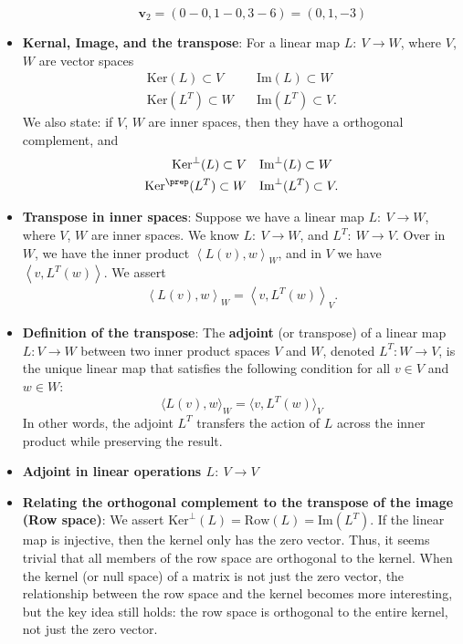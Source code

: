 \documentclass{report}
\begin{document}
\begin{itemize}
\begin{itemize}
                    \[
                        \mathbf{v}_2 = (0 - 0, 1 - 0, 3 - 6) = (0, 1, -3)
                    \]
            \end{itemize}
        \item \textbf{Kernal, Image, and the transpose}: For a linear map $L:\ V \to W$, where $V$, $W$ are vector spaces
            \begin{align*}
                \text{Ker}(L) \subset V &\quad \text{Im}(L) \subset W \\
                \text{Ker}(L^{T}) \subset W &\quad \text{Im}(L^{T}) \subset V
            .\end{align*}
            We also state: if $V$, $W$ are inner spaces, then they have a orthogonal complement, and
            \begin{align*}
                \text{Ker}^{\perp}(L) \subset V &\quad \text{Im}^{\perp}(L) \subset W \\
                \text{Ker}^{\prep}(L^{T}) \subset W &\quad \text{Im}^{\perp}(L^{T}) \subset V
            .\end{align*}
        \item \textbf{Transpose in inner spaces}: Suppose we have a linear map $L:\ V \to W$, where $V$, $W$ are inner spaces. We know $L:\ V \to W$, and $L^{T}:\  W \to V$. Over in $W$, we have the inner product $\left\langle L(v), w\right\rangle_{W}$, and in $V$ we have $\left\langle v, L^{T}(w) \right\rangle $. We assert
            \begin{align*}
                \left\langle L(v), w \right\rangle_{W} = \left\langle v, L^{T}(w) \right\rangle_{V}
            .\end{align*}
        \item \textbf{Definition of the transpose}: The \textbf{adjoint} (or transpose) of a linear map \( L: V \to W \) between two inner product spaces \( V \) and \( W \), denoted \( L^T: W \to V \), is the unique linear map that satisfies the following condition for all \( v \in V \) and \( w \in W \):
            \[
                \langle L(v), w \rangle_W = \langle v, L^T(w) \rangle_V
            \]
            In other words, the adjoint \( L^T \) transfers the action of \( L \) across the inner product while preserving the result.
        \item \textbf{Adjoint in linear operations $L:\ V\to V$}
        \item \textbf{Relating the orthogonal complement to the transpose of the image (Row space)}: We assert $\text{Ker}^{\perp}(L) = \text{Row}(L) = \text{Im}(L^{T})$. If the linear map is injective, then the kernel only has the zero vector. Thus, it seems trivial that all members of the row space are orthogonal to the kernel. When the kernel (or null space) of a matrix is not just the zero vector, the relationship between the row space and the kernel becomes more interesting, but the key idea still holds: the row space is orthogonal to the entire kernel, not just the zero vector.

\end{itemize}
\end{document}
